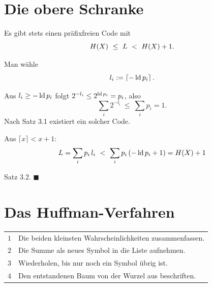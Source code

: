 \section{Die obere Schranke}

\begin{merksatz}
Es gibt stets einen präfixfreien Code mit
\[ H(X) \ \le\ L \ <\ H(X) + 1 . \]

Man wähle
\[ l_i := \left\lceil -\operatorname{ld} p_i \right\rceil . \]

Aus $l_i \ge -\operatorname{ld} p_i$ folgt $2^{-l_i} \le 2^{\operatorname{ld} p_i} = p_i$, also
\[ \sum_i 2^{-l_i} \ \le\ \sum_i p_i = 1 . \]
Nach Satz 3.1 existiert ein solcher Code. \checkmark

Aus $\lceil x\rceil < x+1$:
\[ L = \sum_i p_i\,l_i \ <\ \sum_i p_i\,(-\operatorname{ld} p_i + 1) = H(X) + 1 \]

Satz 3.2. $\blacksquare$

\begin{center}
\begin{minipage}{0.88\textwidth}
\end{minipage}
\end{center}
\end{merksatz}

\section{Das Huffman-Verfahren}

\begin{merksatz}
\begin{center}
\renewcommand{\arraystretch}{1.5}
\begin{tabular}{@{}P{1.0cm}P{7.4cm}@{}}
\toprule
$1$ & Die beiden kleinsten Wahrscheinlichkeiten zusammenfassen.\\
$2$ & Die Summe als neues Symbol in die Liste aufnehmen.\\
$3$ & Wiederholen, bis nur noch ein Symbol übrig ist.\\
$4$ & Den entstandenen Baum von der Wurzel aus beschriften.\\
\bottomrule
\end{tabular}
\end{center}

\begin{center}
\begin{minipage}{0.88\textwidth}
\end{minipage}
\end{center}
\end{merksatz}

